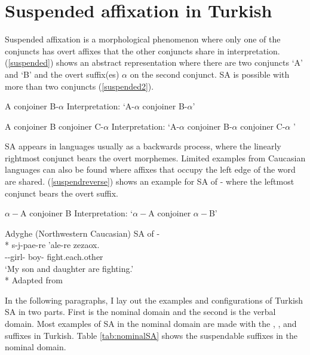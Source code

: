 \section{Suspended affixation in Turkish} \label{whatisSA}

Suspended affixation is a morphological phenomenon where only one of the conjuncts has overt affixes that the other conjuncts share in interpretation. (\ref{suspended}) shows an abstract representation where there are two conjuncts `A' and `B' and the overt suffix(es) $\alpha$ on the second conjunct. SA is possible with more than two conjuncts (\ref{suspended2}).
\begin{exe}
\ex \begin{xlist}
\ex \label{suspended} A conjoiner B-$\alpha$
\glt Interpretation: `A-$\alpha$ conjoiner B-$\alpha$'

\ex \label{suspended2} A conjoiner B conjoiner C-$\alpha$
\glt Interpretation: `A-$\alpha$ conjoiner B-$\alpha$ conjoiner C-$\alpha$ '
\end{xlist}
\end{exe}

SA appears in languages usually as a backwards process, where the linearly rightmost conjunct bears the overt morphemes. Limited examples from Caucasian languages can also be found where affixes that occupy the left edge of the word are shared. (\ref{suspendreverse}) shows an example for SA of {\Fsg-\All} where the leftmost conjunct bears the overt suffix.
\begin{exe}
\ex \label{suspendreverse}
    \begin{xlist}
        \ex $\alpha-$A conjoiner B
        \glt Interpretation: `$\alpha-$A conjoiner $\alpha-$B'
        
        \ex Adyghe (Northwestern Caucasian) SA of {\Fsg-\All} \\*
        \gll s-j\textschwa-p\textctc a\textctc e-re \textteshlig'ale-re zezaox.
        \\ {\Fsg}-{\All}-girl-{\And} boy-{\And} fight.each.other \\
        \glt `My son and daughter are fighting.'\\*
        \hfill Adapted from \citet{erschler2012suspended}
    \end{xlist}
\end{exe}

In the following paragraphs, I lay out the examples and configurations of Turkish SA in two parts. First is the nominal domain and the second is the verbal domain. Most examples of SA in the nominal domain are made with the {\Case}, {\Poss}, and {\Pl} suffixes in Turkish. Table \ref{tab:nominalSA} shows the suspendable suffixes in the nominal domain.

